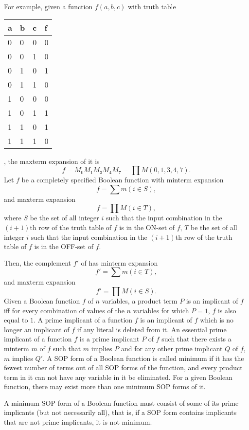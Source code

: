 \documentclass[a4paper,12pt]{article}
\begin{document}
\begin{itemize}
\begin{itemize}
\begin{itemize}
\begin{itemize}
\begin{itemize}
\begin{itemize}
\begin{itemize}
For example, given a function $f(a,b,c)$ with truth table
\begin{longtable}[c]{|m|m|m|m|}
\hline
a & b & c & f\\\hline
0 & 0 & 0 & 0\\\hline
0 & 0 & 1 & 0\\\hline
0 & 1 & 0 & 1\\\hline
0 & 1 & 1 & 0\\\hline
1 & 0 & 0 & 0\\\hline
1 & 0 & 1 & 1\\\hline
1 & 1 & 0 & 1\\\hline
1 & 1 & 1 & 0\\\hline
\end{longtable}
, the maxterm expansion of it is
\[f=M_0M_1M_3M_4M_7=\prod M(0,1,3,4,7).\]
Let $f$ be a completely specified Boolean function with minterm expansion
\[f=\sum m(i\in S),\]
and maxterm expansion
\[f=\prod M(i\in T),\]
where $S$ be the set of all integer $i$ such that the input combination in the $(i+1)$th row of the truth table of $f$ is in the ON-set of $f$, $T$ be the set of all integer $i$ such that the input combination in the $(i+1)$th row of the truth table of $f$ is in the OFF-set of $f$.

Then, the complement $f'$ of has minterm expansion 
\[f'=\sum m(i\in T),\]
and maxterm expansion
\[f'=\prod M(i\in S).\]
Given a Boolean function $f$ of $n$ variables, a product term $P$ is an implicant of $f$ iff for every combination of values of the $n$ variables for which $P = 1$, $f$ is also equal to $1$.
A prime implicant of a function $f$ is an implicant of $f$ which is no longer an implicant of $f$ if any literal is deleted from it.
An essential prime implicant of a function $f$ is a prime implicant $P$ of $f$ such that there exists a minterm $m$ of $f$ such that $m$ implies $P$ and for any other prime implicant $Q$ of $f$, $m$ implies $Q'$.
A SOP form of a Boolean function is called minimum if it has the fewest number of terms out of all SOP forms of the function, and every product term in it can not have any variable in it be eliminated. For a given Boolean function, there may exist more than one minimum SOP forms of it.

A minimum SOP form of a Boolean function must consist of some of its prime implicants (but not necessarily all), that is, if a SOP form contains implicants that are not prime implicants, it is not minimum.


\end{itemize}
\end{itemize}
\end{itemize}
\end{itemize}
\end{itemize}
\end{itemize}
\end{itemize}
\end{document}
